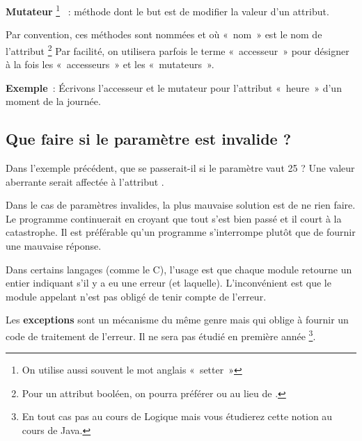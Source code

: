 	\textbf{Mutateur}%
	\footnote{On utilise aussi souvent le mot anglais «~setter~»}%
	~: méthode dont le but est de modifier la valeur d'un attribut.

	Par convention, 
	ces méthodes sont nommées  et 
	 où «~nom~» est le nom de l'attribut%
	\footnote{%
		Pour un attribut booléen, 
		on pourra préférer  ou  
		au lieu de . 
	}
	Par facilité, on utilisera parfois le terme «~accesseur~»
	pour désigner à la fois les «~accesseurs~» et les «~mutateurs~».

	\textbf{Exemple}~:
	Écrivons l'accesseur et le mutateur pour l'attribut 
	«~heure~» d'un moment de la journée.



	\subsection{Que faire si le paramètre est invalide ?}
	
	Dans l'exemple précédent, 
	que se passerait-il si le paramètre  vaut 25 ? 
	Une valeur aberrante serait affectée à l'attribut .

	Dans le cas de paramètres invalides, 
	la plus mauvaise solution est de ne rien faire. 
	Le programme continuerait en croyant que tout s’est bien
	passé et il court à la catastrophe. 
	Il est préférable qu’un programme s'interrompe 
	plutôt que de fournir une mauvaise réponse. 

	Dans certains langages (comme le C), 
	l’usage est que chaque module retourne un entier indiquant 
	s'il y a eu une erreur (et laquelle). 
	L’inconvénient est que le module appelant n’est pas
	obligé de tenir compte de l’erreur.

	Les \textbf{exceptions} sont un mécanisme du même genre 
	mais qui oblige à fournir un code de traitement de l’erreur. 
	Il ne sera pas étudié en première année%
	\footnote{%
		En tout cas pas au cours de Logique 
		mais vous étudierez cette notion au cours de Java.%
	}.

